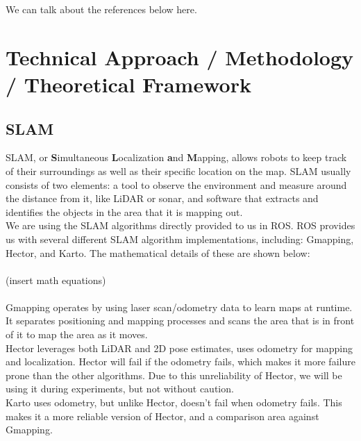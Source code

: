 \documentclass{article}
\begin{document}

We can talk about the references below here. 




\section{Technical Approach / Methodology / Theoretical Framework}


\subsection{SLAM}
SLAM, or \textbf{S}imultaneous \textbf{L}ocalization \textbf{a}nd \textbf{M}apping, allows robots to keep track of their surroundings as well as their specific location on the map. SLAM usually consists of two elements: a tool to observe the environment and measure around the distance from it, like LiDAR or sonar, and software that extracts and identifies the objects in the area that it is mapping out.  
\\
We are using the SLAM algorithms directly provided to us in ROS. ROS provides us with several different SLAM algorithm implementations, including: Gmapping, Hector, and Karto. The mathematical details of these are shown below: 
\\\\(insert math equations)
\\\\ Gmapping operates by using laser scan/odometry data to learn maps at runtime. It separates positioning and mapping processes and scans the area that is in front of it to map the area as it moves. 
\\
\indent Hector leverages both LiDAR and 2D pose estimates, uses odometry for mapping and localization. Hector will fail if the odometry fails, which makes it more failure prone than the other algorithms. Due to this unreliability of Hector, we will be using it during experiments, but not without caution. 
\\
\indent Karto uses odometry, but unlike Hector, doesn’t fail when odometry fails. This makes it a more reliable version of Hector, and a comparison area against Gmapping. 
\end{document}
